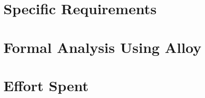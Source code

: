 \clearpage
{{\section{Specific Requirements}}}
\label{sect:requirements}


\clearpage
{{\section{Formal Analysis Using Alloy}}}
\label{sect:alloy}


\clearpage
{{\section{Effort Spent}}}
\label{sect:effort}



\clearpage
{}







